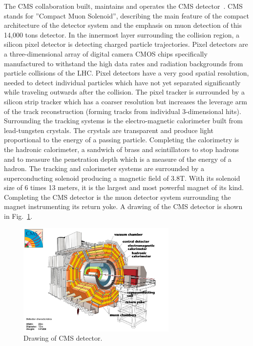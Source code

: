 \documentclass{wscpaperproc}
\theoremstyle{wsc}
\begin{document}
The CMS collaboration built, maintains and operates the CMS detector~. CMS stands for ''Compact Muon Solenoid'', describing the main feature of the compact architecture of the detector system and the emphasis on muon detection of this 14,000 tons detector. In the innermost layer surrounding the collision region, a silicon pixel detector is detecting charged particle trajectories. Pixel detectors are a three-dimensional array of digital camera CMOS chips specifically manufactured to withstand the high data rates and radiation backgrounds from particle collisions of the LHC. Pixel detectors have a very good spatial resolution, needed to detect individual particles which have not yet separated significantly while traveling outwards after the collision. The pixel tracker is surrounded by a silicon strip tracker which has a coarser resolution but increases the leverage arm of the track reconstruction (forming tracks from individual 3-dimensional hits). Surrounding the tracking systems is the electro-magnetic calorimeter built from lead-tungsten crystals. The crystals are transparent and produce light proportional to the energy of a passing particle. Completing the calorimetry is the hadronic calorimeter, a sandwich of brass and scintillators to stop hadrons and to measure the penetration depth which is a measure of the energy of a hadron. The tracking and calorimeter systems are surrounded by a superconducting solenoid producing a magnetic field of 3.8T. With its solenoid size of 6 times 13 meters, it is the largest and most powerful magnet of its kind. Completing the CMS detector is the muon detector system surrounding the magnet instrumenting its return yoke. A drawing of the CMS detector is shown in Fig.~\ref{fig:cms}.

\begin{figure}[htb]
{
   \centering
   \includegraphics[width=0.70\textwidth]{cms}
   \caption{Drawing of CMS detector.
   \label{fig:cms}}
}
\end{figure}
\end{document}
